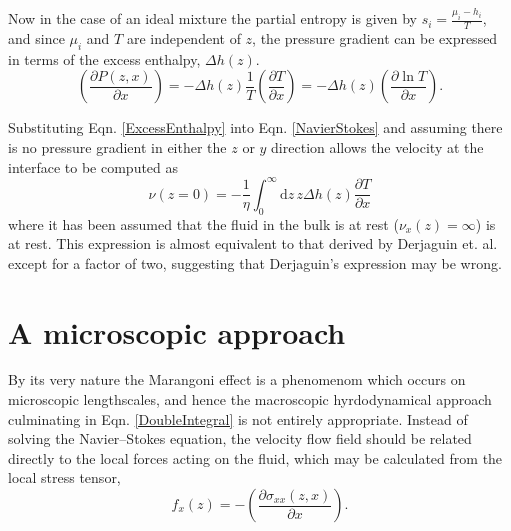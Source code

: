 Now in the case of an ideal mixture the partial entropy is given by $s_{i}=\frac{\mu_{i}-h_{i}}{T}$, and since $\mu_{i}$ and $T$ are independent of $z$, the pressure gradient can be expressed in terms of the excess enthalpy, $\Delta h(z)$.
\begin{equation}
\label{ExcessEnthalpy}
\left(\frac{\partial P(z,x)}{\partial x}\right)= - \Delta h(z)\frac{1}{T} \left( \frac{\partial T}{\partial x} \right) 
= - \Delta h(z) \left( \frac{\partial \ln T}{\partial x} \right).
\end{equation}

Substituting Eqn. \ref{ExcessEnthalpy} into Eqn. \ref{NavierStokes} and assuming there is no pressure gradient in either the $z$ or $y$ direction allows the velocity at the interface to be computed as
\begin{equation}
\label{DoubleIntegral}
\nu (z=0) = - \frac{1}{\eta}\int_{0}^{\infty} \mathrm{d}z\, z \Delta h(z) \frac{\partial T}{\partial x}
\end{equation}
where it has been assumed that the fluid in the bulk is at rest ($\nu_{x}(z)=\infty$) is at rest.
This expression is almost equivalent to that derived by Derjaguin et. al. except for a factor of two, suggesting that Derjaguin's expression may be wrong.\cite{SurfaceForces, Anderson}

\section{A microscopic approach}
By its very nature the Marangoni effect is a phenomenom which occurs on microscopic lengthscales, and hence the macroscopic hyrdodynamical approach culminating in Eqn. \ref{DoubleIntegral} is not entirely appropriate.
Instead of solving the Navier--Stokes equation, the velocity flow field should be  related directly to the local forces acting on the fluid, which may be calculated from the local stress tensor,
\begin{equation}
\label{ForceStress}
f_{x}(z) = - \left( \frac{\partial \sigma_{xx}(z,x)}{\partial x} \right).
\end{equation}

